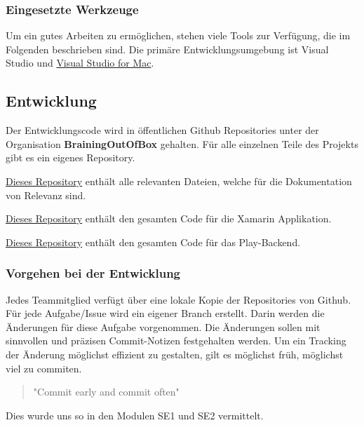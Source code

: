 \subsubsection*{Eingesetzte Werkzeuge}
Um ein gutes Arbeiten zu ermöglichen, stehen viele Tools zur Verfügung, die im Folgenden beschrieben sind. Die primäre Entwicklungsumgebung ist Visual Studio und \href{https://visualstudio.microsoft.com/de/vs/mac/}{Visual Studio for Mac}.

\subsection{Entwicklung}
Der Entwicklungscode wird in öffentlichen Github Repositories unter der Organisation \textbf{BrainingOutOfBox} gehalten. Für alle einzelnen Teile des Projekts gibt es ein eigenes Repository.

\begin{description}[leftmargin=!,labelwidth=2cm]
\item [Doc] \href{https://github.com/BrainingOutOfBox/Doc-BA}{Dieses Repository} enthält alle relevanten Dateien, welche für die Dokumentation von Relevanz sind.
\item [App] \href{https://github.com/BrainingOutOfBox/App}{Dieses Repository} enthält den gesamten Code für die Xamarin Applikation.
\item [API] \href{https://github.com/BrainingOutOfBox/API}{Dieses Repository} enthält den gesamten Code für das Play-Backend.
\end{description}

\subsubsection*{Vorgehen bei der Entwicklung}
Jedes Teammitglied verfügt über eine lokale Kopie der Repositories von Github. Für jede Aufgabe/Issue wird ein eigener Branch erstellt. Darin werden die Änderungen für diese Aufgabe vorgenommen. Die Änderungen sollen mit sinnvollen und präzisen Commit-Notizen festgehalten werden. Um ein Tracking der Änderung möglichst effizient zu gestalten, gilt es möglichst früh, möglichst viel zu commiten.

\begin{quote}
	"Commit early and commit often"    
\end{quote}

Dies wurde uns so in den Modulen SE1 und SE2 vermittelt.

